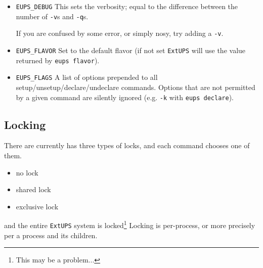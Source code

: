 \documentclass{article}
\newcommand{\code}[1]{\texttt{#1}}
\newcommand{\eups}{\code{ExtUPS}\xspace}
\begin{document}
\begin{itemize}
  \item \code{EUPS\_DEBUG}
    This sets the verbosity; equal to the difference between the number of \code{-v}s
    and \code{-q}s.

    If you are confused by some error, or simply nosy, try adding a \code{-v}.

  \item \code{EUPS\_FLAVOR}
    Set to the default flavor (if not set \eups will use the value returned
    by \code{eups flavor}).

  \item \code{EUPS\_FLAGS}
    A list of options prepended to all setup/unsetup/declare/undeclare commands. Options
    that are not permitted by a given command are silently ignored (e.g. \code{-k}
    with \code{eups declare}).
\end{itemize}


\subsection{Locking}

There are currently has three types of locks, and each command chooses one of them.
\begin{itemize}
  \item no lock
  \item shared lock
  \item exclusive lock
\end{itemize}
and the entire \eups system is locked\footnote{This may be a problem...}
Locking is per-process, or more precisely per a process and its children.
\end{document}
